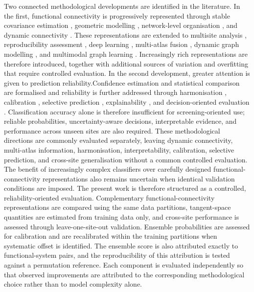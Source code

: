 Two connected methodological developments are identified in the literature. In the first, functional connectivity is progressively represented through stable covariance estimation \cite{LedoitWolf2004}, geometric modelling \cite{Varoquauxetal2010}, network-level organisation \cite{Yeoetal2011}, and dynamic connectivity \cite{Hutchisonetal2013,LeonardiVanDeVille2015,Pretietal2017}. These representations are extended to multisite analysis \cite{DiMartinoetal2014}, reproducibility assessment \cite{Abrahametal2017}, deep learning \cite{Heinsfeldetal2018,Eslamietal2019,AlmuqhimSaeed2021}, multi-atlas fusion \cite{Liuetal2024MADE}, dynamic graph modelling \cite{Tangetal2025GNNLSTM}, and multimodal graph learning \cite{Tangetal2026CASGNN}. Increasingly rich representations are therefore introduced, together with additional sources of variation and overfitting that require controlled evaluation. In the second development, greater attention is given to prediction reliability.Confidence estimation and statistical comparison are formalised and reliability is further addressed through harmonisation \cite{Johnsonetal2007,Fortinetal2018}, calibration \cite{Guoetal2017}, selective prediction \cite{GeifmanElYaniv2017}, explainability \cite{LundbergLee2017}, and decision-oriented evaluation \cite{VanCalsteretal2018}. Classification accuracy alone is therefore insufficient for screening-oriented use; reliable probabilities, uncertainty-aware decisions, interpretable evidence, and performance across unseen sites are also required. These methodological directions are commonly evaluated separately, leaving dynamic connectivity, multi-atlas information, harmonisation, interpretability, calibration, selective prediction, and cross-site generalisation without a common controlled evaluation. The benefit of increasingly complex classifiers over carefully designed functional-connectivity representations also remains uncertain when identical validation conditions are imposed. The present work is therefore structured as a controlled, reliability-oriented evaluation. Complementary functional-connectivity representations are compared using the same data partitions, tangent-space quantities are estimated from training data only, and cross-site performance is assessed through leave-one-site-out validation. Ensemble probabilities are assessed for calibration and are recalibrated within the training partitions when systematic offset is identified. The ensemble score is also attributed exactly to functional-system pairs, and the reproducibility of this attribution is tested against a permutation reference. Each component is evaluated independently so that observed improvements are attributed to the corresponding methodological choice rather than to model complexity alone.

